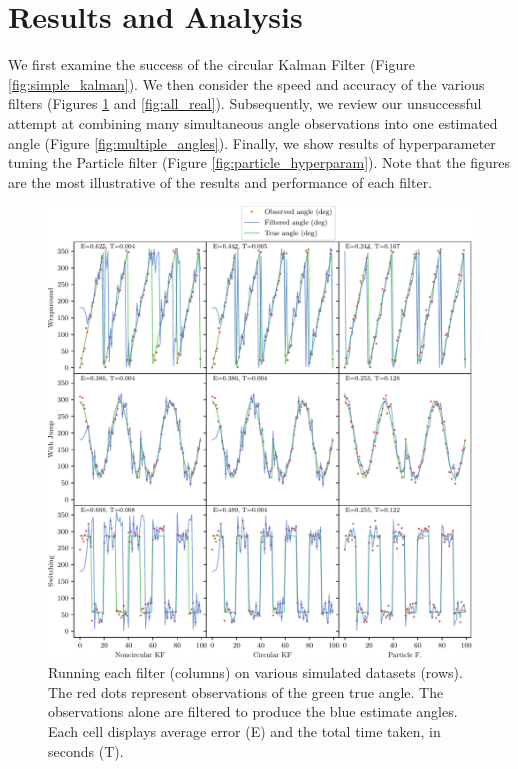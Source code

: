 \documentclass[11pt]{amsart}
\begin{document}
\section{Results and Analysis}
We first examine the success of the circular Kalman Filter (Figure \ref{fig:simple_kalman}). 
We then consider the speed and accuracy of the various filters (Figures \ref{fig:all_simulated} and \ref{fig:all_real}).
Subsequently, we review our unsuccessful attempt at combining many simultaneous angle observations into one estimated angle (Figure \ref{fig:multiple_angles}).
Finally, we show results of hyperparameter tuning the Particle filter (Figure \ref{fig:particle_hyperparam}). Note that the figures are the most illustrative of the results and performance of each filter.

\begin{figure}[htp]
    \centering
    \includegraphics[width=.95\textwidth]{actual_paper_graphs/all_simulated.pdf}\hfill
    \caption{
        Running each filter (columns) on various simulated datasets (rows).
        The red dots represent observations of the green true angle. 
        The observations alone are filtered to produce the blue estimate angles.
        Each cell displays average error (E) and the total time taken, in seconds (T).
        }
    \label{fig:all_simulated}
\end{figure}
\end{document}
